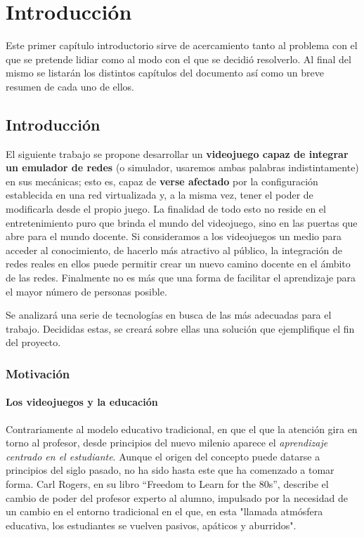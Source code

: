 \chapter{Introducción}\label{chap:Intro}
Este primer capítulo introductorio sirve de acercamiento tanto al problema con el que se pretende lidiar como al modo con el que se decidió resolverlo. Al final del mismo se listarán los distintos capítulos del documento así como un breve resumen de cada uno de ellos.

\section{Introducción}
El siguiente trabajo se propone desarrollar un \textbf{videojuego capaz de integrar un emulador de redes} (o simulador, usaremos ambas palabras indistintamente) en sus mecánicas; esto es, capaz de \textbf{verse afectado} por la configuración establecida en una red virtualizada y, a la misma vez, tener el poder de modificarla desde el propio juego. La finalidad de todo esto no reside en el entretenimiento puro que brinda el mundo del videojuego, sino en las puertas que abre para el mundo docente. Si consideramos a los videojuegos un medio para acceder al conocimiento, de hacerlo más atractivo al público, la integración de redes reales en ellos puede permitir crear un nuevo camino docente en el ámbito de las redes. Finalmente no es más que una forma de facilitar el aprendizaje para el mayor número de personas posible.

Se analizará una serie de tecnologías en busca de las más adecuadas para el trabajo. Decididas estas, se creará sobre ellas una solución que ejemplifique el fin del proyecto.

\subsection{Motivación}
\subsubsection{Los videojuegos y la educación}
Contrariamente al modelo educativo tradicional, en que el que la atención gira en torno al profesor, desde principios del nuevo milenio aparece el \textit{aprendizaje centrado en el estudiante}. Aunque el origen del concepto puede datarse a principios del siglo pasado\cite{studentcentered}, no ha sido hasta este que ha comenzado a tomar forma. Carl Rogers, en su libro ``Freedom to Learn for the 80s'', describe el cambio de poder del profesor experto al alumno, impulsado por la necesidad de un cambio en el entorno tradicional en el que, en esta "llamada atmósfera educativa, los estudiantes se vuelven pasivos, apáticos y aburridos".

